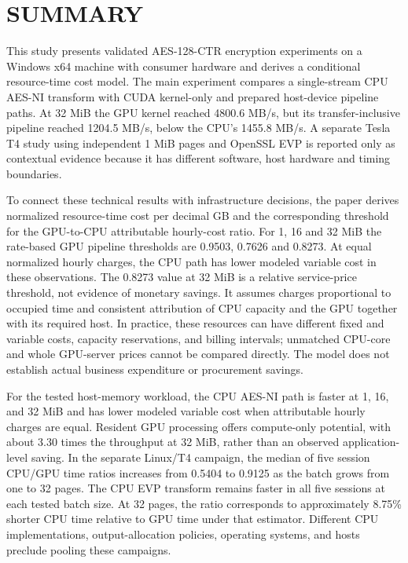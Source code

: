\documentclass[11pt,b5paper]{article}
\begin{document}
\begingroup\fontsize{10}{12}\selectfont\sloppy
\printbibliography[title={References}]
\endgroup

\section*{SUMMARY}
This study presents validated AES-128-CTR encryption experiments on a Windows x64 machine with consumer hardware and derives a conditional resource-time cost model. The main experiment compares a single-stream CPU AES-NI transform with CUDA kernel-only and prepared host-device pipeline paths. At 32 MiB the GPU kernel reached 4800.6 MB/s, but its transfer-inclusive pipeline reached 1204.5 MB/s, below the CPU's 1455.8 MB/s. A separate Tesla T4 study using independent 1 MiB pages and OpenSSL EVP is reported only as contextual evidence because it has different software, host hardware and timing boundaries.\par
To connect these technical results with infrastructure decisions, the paper derives normalized resource-time cost per decimal GB and the corresponding threshold for the GPU-to-CPU attributable hourly-cost ratio. For 1, 16 and 32 MiB the rate-based GPU pipeline thresholds are 0.9503, 0.7626 and 0.8273. At equal normalized hourly charges, the CPU path has lower modeled variable cost in these observations. The 0.8273 value at 32 MiB is a relative service-price threshold, not evidence of monetary savings. It assumes charges proportional to occupied time and consistent attribution of CPU capacity and the GPU together with its required host. In practice, these resources can have different fixed and variable costs, capacity reservations, and billing intervals; unmatched CPU-core and whole GPU-server prices cannot be compared directly. The model does not establish actual business expenditure or procurement savings.\par
For the tested host-memory workload, the CPU AES-NI path is faster at 1, 16, and 32 MiB and has lower modeled variable cost when attributable hourly charges are equal. Resident GPU processing offers compute-only potential, with about 3.30 times the throughput at 32 MiB, rather than an observed application-level saving. In the separate Linux/T4 campaign, the median of five session CPU/GPU time ratios increases from 0.5404 to 0.9125 as the batch grows from one to 32 pages. The CPU EVP transform remains faster in all five sessions at each tested batch size. At 32 pages, the ratio corresponds to approximately 8.75\% shorter CPU time relative to GPU time under that estimator. Different CPU implementations, output-allocation policies, operating systems, and hosts preclude pooling these campaigns.\par
\end{document}
